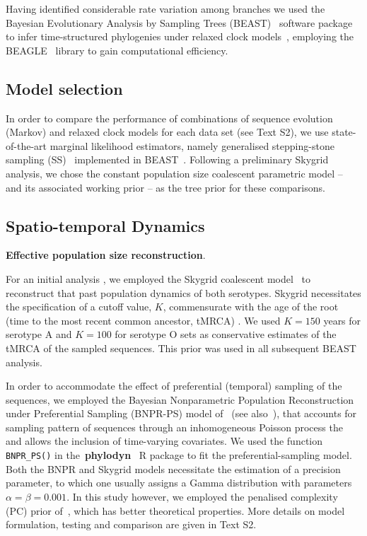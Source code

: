 \documentclass[10pt]{article}
\begin{document}
Having identified considerable rate variation among branches we used the Bayesian Evolutionary Analysis by Sampling Trees (BEAST)~\citep{Drummond2012,Suchard2018} software package to infer time-structured phylogenies under relaxed clock models~\citep{Drummond2006}, employing the BEAGLE~\citep{Ayres2012} library to gain computational efficiency.

\subsection*{Model selection}

In order to compare the performance of combinations of sequence evolution (Markov) and relaxed clock models for each data set (see Text S2), we use state-of-the-art marginal likelihood estimators, namely generalised stepping-stone sampling (SS)~\citep{Baele2015} implemented in BEAST~\citep{Suchard2018}.
Following a preliminary Skygrid analysis, we chose the constant population size coalescent parametric model -- and its associated working prior -- as the tree prior for these comparisons.

\subsection*{Spatio-temporal Dynamics}

\textbf{Effective population size reconstruction}.

For an initial analysis , we employed the Skygrid coalescent model~\citep{Gill2012} to reconstruct that past population dynamics of both serotypes.
Skygrid necessitates the specification of a cutoff value, $K$, commensurate with the age of the root (time to the most recent common ancestor, tMRCA) .
We used $K = 150$ years for serotype A and $K = 100$ for serotype O sets as conservative estimates of the tMRCA of the sampled sequences. 
This prior was used in all subsequent BEAST analysis.

In order to accommodate the effect of preferential (temporal) sampling of the sequences, we employed the  Bayesian Nonparametric Population Reconstruction under Preferential Sampling (BNPR-PS) model of~\cite{Karcher2019} (see also~\cite{Karcher2016}), that accounts for sampling pattern of sequences through an inhomogeneous Poisson process the and allows the inclusion of time-varying covariates.
We used the function \verb|BNPR_PS()| in the~\textbf{phylodyn}~\citep{Karcher2017} R package to fit the preferential-sampling model.
Both the BNPR and Skygrid models necessitate the estimation of a precision parameter, to which one usually assigns a Gamma distribution with parameters $\alpha = \beta = 0.001$.
In this study however, we employed the penalised complexity (PC) prior of~\cite{Simpson2017}, which has better theoretical properties. %
More details on model formulation, testing and comparison are given in Text S2.
\end{document}
